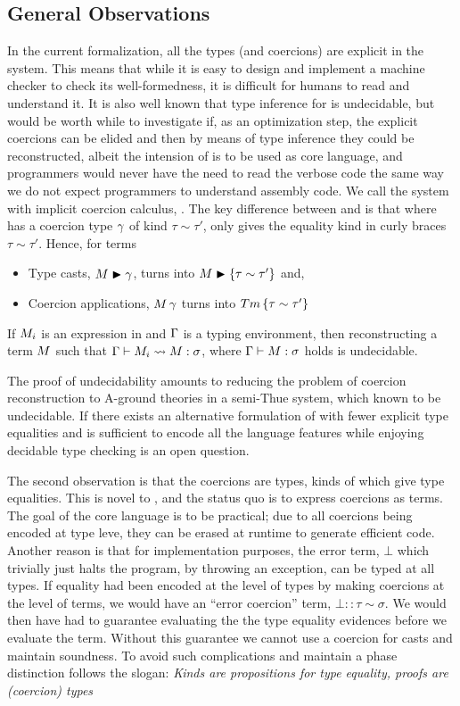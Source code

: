 \documentclass[manuscript,screen,nonacm]{acmart}
\begin{document}
\subsection{General Observations}
In the current formalization, all the types (and coercions) are explicit in the system. This means that while it is easy to design and implement a machine checker to check its well-formedness, it is difficult for humans to read and understand it. It is also well known that type inference for \SF is undecidable\cite{wells_typability_1999}, but would be worth while to investigate if, as an optimization step, the explicit coercions can be elided and then by means of type inference they could be reconstructed, albeit the intension of \SFC is to be used as core language, and programmers would never have the need to read the verbose code the same way we do not expect programmers to understand assembly code. We call the system with implicit coercion calculus, \SFCi. The key difference between \SFC and \SFCi is that where \SFC has a coercion type $\gamma$ of kind $\tau\sim\tau'$, \SFCi only gives the equality kind in curly braces $\tau\sim\tau'$. Hence, for terms
\begin{itemize}
\item Type casts, $M\mathrel{\blacktriangleright}\gamma$, turns into $M\mathrel{\blacktriangleright}\{\tau \sim \tau'\}$ and,
\item Coercion applications, $M\,\gamma$ turns into $Tm\,\{\tau \sim \tau'\}$
\end{itemize}
\begin{theorem}
 If $M_i$ is an expression in \SFCi and $\Gamma$ is a typing environment, then reconstructing a \SFC term $M$ such that $\Gamma \vdash M_i \rightsquigarrow M : \sigma$, where $\Gamma \vdash M : \sigma$ holds is undecidable.
\end{theorem}
The proof of undecidability amounts to reducing the problem of coercion reconstruction to A-ground theories in a semi-Thue system, which known to be undecidable\cite{post_recursive_1947}. If there exists an alternative formulation of \SFCi with fewer explicit type equalities and is sufficient to encode all the language features while enjoying decidable type checking is an open question.

The second observation is that the coercions are types, kinds of which give type equalities. This is novel to \SFC, and the status quo is to express coercions as terms. The goal of the core language is to be practical; due to all coercions being encoded at type leve, they can be erased at runtime to generate efficient code. Another reason is that for implementation purposes, the error term, $\bot$ which trivially just halts the program, by throwing an exception, can be typed at all types. If equality had been encoded at the level of types by making coercions at the level of terms, we would have an ``error coercion'' term, $\bot :: \tau \sim \sigma$. We would then have had to guarantee evaluating the the type equality evidences before we evaluate the term. Without this guarantee we cannot use a coercion for casts and maintain soundness. To avoid such complications and maintain a phase distinction \SFC follows the slogan: \emph{Kinds are propositions for type equality, proofs are (coercion) types}
\end{document}
